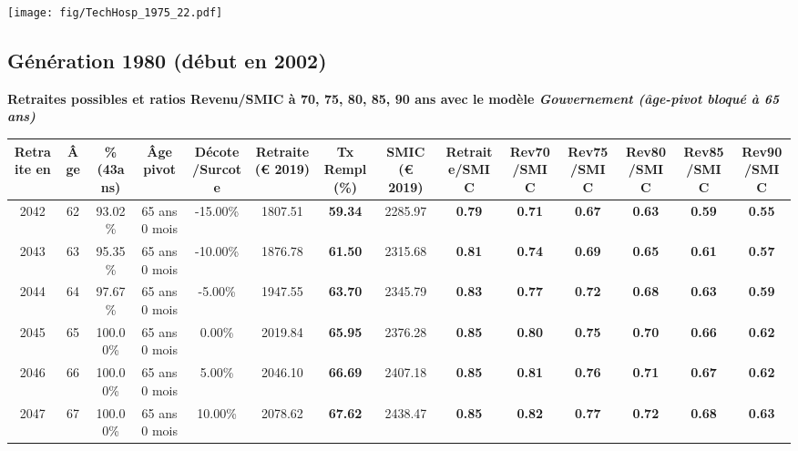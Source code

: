  \vspace{0.1cm} 

 \begin{center}\texttt{[image: fig/TechHosp\_1975\_22.pdf]}\end{center} \label{fig/TechHosp_1975_22.pdf} 

\newpage 
 
\subsection{Génération 1980 (début en 2002)} 

{\bf \noindent Retraites possibles et ratios Revenu/SMIC à 70, 75, 80, 85, 90 ans avec le modèle \emph{Gouvernement (âge-pivot bloqué à 65 ans)}}  
 
\begin{adjustbox}{max width=\textwidth} 
\begin{tabular}[htb]{|c|c||c|c|c||c|c||c||c|c|c|c|c|c|} 
\hline 
 Retraite en &  Âge &  \%(43ans) &  Âge pivot &  Décote/Surcote &  Retraite (\euro{} 2019) &  Tx Rempl(\%) &  SMIC (\euro{} 2019) &  Retraite/SMIC &  Rev70/SMIC &  Rev75/SMIC &  Rev80/SMIC &  Rev85/SMIC &  Rev90/SMIC \\ 
\hline \hline 
 2042 &  62 &  93.02\% &  65 ans 0 mois &  -15.00\% &  1807.51 &  {\bf 59.34} &  2285.97 &  {\bf {\color{red} 0.79}} &  {\bf {\color{red} 0.71}} &  {\bf {\color{red} 0.67}} &  {\bf {\color{red} 0.63}} &  {\bf {\color{red} 0.59}} &  {\bf {\color{red} 0.55}} \\ 
\hline 
 2043 &  63 &  95.35\% &  65 ans 0 mois &  -10.00\% &  1876.78 &  {\bf 61.50} &  2315.68 &  {\bf {\color{red} 0.81}} &  {\bf {\color{red} 0.74}} &  {\bf {\color{red} 0.69}} &  {\bf {\color{red} 0.65}} &  {\bf {\color{red} 0.61}} &  {\bf {\color{red} 0.57}} \\ 
\hline 
 2044 &  64 &  97.67\% &  65 ans 0 mois &  -5.00\% &  1947.55 &  {\bf 63.70} &  2345.79 &  {\bf {\color{red} 0.83}} &  {\bf {\color{red} 0.77}} &  {\bf {\color{red} 0.72}} &  {\bf {\color{red} 0.68}} &  {\bf {\color{red} 0.63}} &  {\bf {\color{red} 0.59}} \\ 
\hline 
 2045 &  65 &  100.00\% &  65 ans 0 mois &  0.00\% &  2019.84 &  {\bf 65.95} &  2376.28 &  {\bf {\color{red} 0.85}} &  {\bf {\color{red} 0.80}} &  {\bf {\color{red} 0.75}} &  {\bf {\color{red} 0.70}} &  {\bf {\color{red} 0.66}} &  {\bf {\color{red} 0.62}} \\ 
\hline 
 2046 &  66 &  100.00\% &  65 ans 0 mois &  5.00\% &  2046.10 &  {\bf 66.69} &  2407.18 &  {\bf {\color{red} 0.85}} &  {\bf {\color{red} 0.81}} &  {\bf {\color{red} 0.76}} &  {\bf {\color{red} 0.71}} &  {\bf {\color{red} 0.67}} &  {\bf {\color{red} 0.62}} \\ 
\hline 
 2047 &  67 &  100.00\% &  65 ans 0 mois &  10.00\% &  2078.62 &  {\bf 67.62} &  2438.47 &  {\bf {\color{red} 0.85}} &  {\bf {\color{red} 0.82}} &  {\bf {\color{red} 0.77}} &  {\bf {\color{red} 0.72}} &  {\bf {\color{red} 0.68}} &  {\bf {\color{red} 0.63}} \\ 
\hline 
\hline 
\end{tabular} 
\end{adjustbox} 
 
